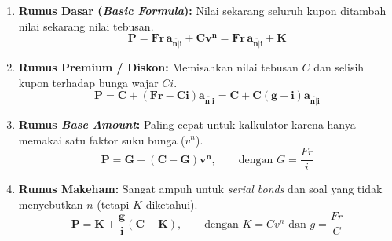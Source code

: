 \documentclass[10pt,a4paper]{article}
\newcommand{\angl}[1]{\overline{#1|}}
\begin{document}
\begin{rumusbox}
\begin{enumerate}[leftmargin=1.6em, topsep=1pt, itemsep=3pt]
    \item \textbf{Rumus Dasar (\textit{Basic Formula}):} Nilai sekarang seluruh kupon ditambah nilai sekarang nilai tebusan.
    \[
        \mathbf{P = Fr \, a_{\angl{n}i} + C v^n = Fr \, a_{\angl{n}i} + K}
    \]
    \item \textbf{Rumus Premium / Diskon:} Memisahkan nilai tebusan $C$ dan selisih kupon terhadap bunga wajar $Ci$.
    \[
        \mathbf{P = C + (Fr - Ci) a_{\angl{n}i} = C + C(g - i) a_{\angl{n}i}}
    \]
    \item \textbf{Rumus \textit{Base Amount}:} Paling cepat untuk kalkulator karena hanya memakai satu faktor suku bunga ($v^n$).
    \[
        \mathbf{P = G + (C - G) v^n}, \qquad \text{dengan } G = \frac{Fr}{i}
    \]
    \item \textbf{Rumus Makeham:} Sangat ampuh untuk \textit{serial bonds} dan soal yang tidak menyebutkan $n$ (tetapi $K$ diketahui).
    \[
        \mathbf{P = K + \frac{g}{i}(C - K)}, \qquad \text{dengan } K = C v^n \text{ dan } g = \frac{Fr}{C}
    \]
\end{enumerate}
\end{rumusbox}
\end{document}
